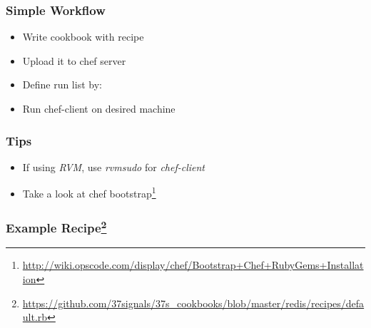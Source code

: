 \documentclass[16pt]{beamer}
\begin{document}
\begin{frame}
  \frametitle{Simple Workflow}
  \begin{itemize}
    \item Write cookbook with recipe
    \item Upload it to chef server
    \item Define run list by:
    \item Run chef-client on desired machine
  \end{itemize}
\end{frame}

\begin{frame}
  \frametitle{Tips}
  \begin{itemize}
    \item If using \emph{RVM}, use \emph{rvmsudo} for \emph{chef-client}
    \item Take a look at chef bootstrap\footnote{\url{http://wiki.opscode.com/display/chef/Bootstrap+Chef+RubyGems+Installation}}
  \end{itemize}
\end{frame}

\begin{frame}
  \frametitle{Example Recipe\footnote{\url{https://github.com/37signals/37s_cookbooks/blob/master/redis/recipes/default.rb}}}
  
  \label{redis_recipe}
\end{frame}
\end{document}
